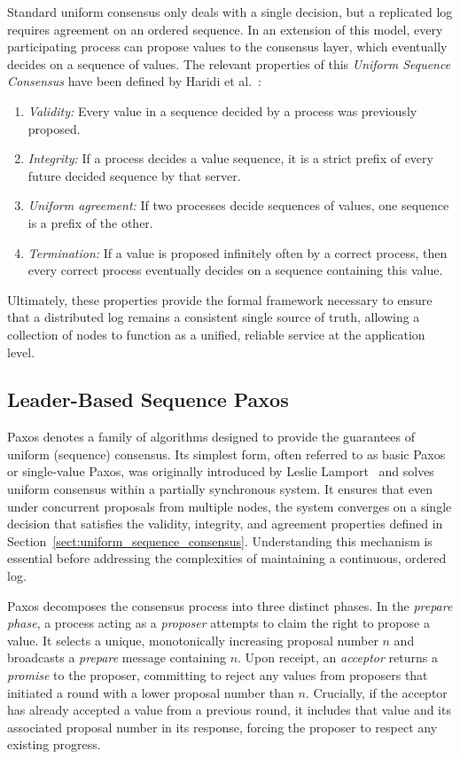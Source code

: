 Standard uniform consensus only deals with a single decision, but a replicated log requires agreement on an ordered sequence. In an extension of this model, every participating process can propose values to the consensus layer, which eventually decides on a sequence of values. The relevant properties of this \textit{Uniform Sequence Consensus} have been defined by Haridi et al.~\cite{Haridi-LeaderBasedSequencePaxos-2020}:
\begin{enumerate}
  \item[] \textit{Validity:} Every value in a sequence decided by a process was previously proposed.
  \item[] \textit{Integrity:} If a process decides a value sequence, it is a strict prefix of every future decided sequence by that server. 
  \item[] \textit{Uniform agreement:}  If two processes decide sequences of values, one sequence is a prefix of the other.
  \item[] \textit{Termination:} If a value is proposed infinitely often by a correct process, then every correct process eventually decides on a sequence containing this value.
\end{enumerate}

Ultimately, these properties provide the formal framework necessary to ensure that a distributed log remains a consistent single source of truth, allowing a collection of nodes to function as a unified, reliable service at the application level.

\subsection{Leader-Based Sequence Paxos}

Paxos denotes a family of algorithms designed to provide the guarantees of uniform (sequence) consensus. Its simplest form, often referred to as basic Paxos or single-value Paxos, was originally introduced by Leslie Lamport~\cite{Lamport-Paxos-2001} and solves uniform consensus within a partially synchronous system. It ensures that even under concurrent proposals from multiple nodes, the system converges on a single decision that satisfies the validity, integrity, and agreement properties defined in Section~\ref{sect:uniform_sequence_consensus}. Understanding this mechanism is essential before addressing the complexities of maintaining a continuous, ordered log.

Paxos decomposes the consensus process into three distinct phases. In the \textit{prepare phase}, a process acting as a \textit{proposer} attempts to claim the right to propose a value. It selects a unique, monotonically increasing proposal number $n$ and broadcasts a \textit{prepare} message containing $n$. Upon receipt, an \textit{acceptor} returns a \textit{promise} to the proposer, committing to reject any values from proposers that initiated a round with a lower proposal number than $n$. Crucially, if the acceptor has already accepted a value from a previous round, it includes that value and its associated proposal number in its response, forcing the proposer to respect any existing progress.

